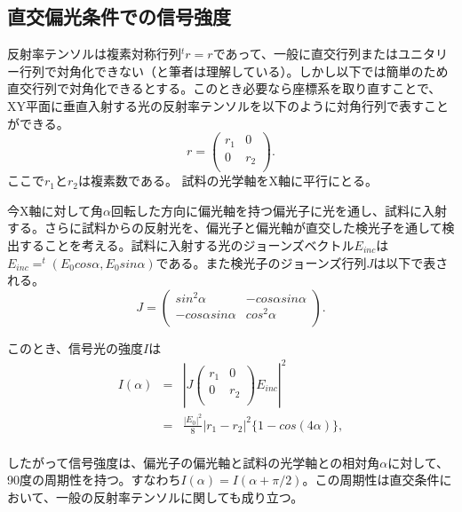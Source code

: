 \subsection{直交偏光条件での信号強度}
\label{sec:diagonazed_reflectance}
反射率テンソルは複素対称行列${}^t r=r$であって、一般に直交行列またはユニタリー行列で対角化できない（と筆者は理解している）。しかし以下では簡単のため直交行列で対角化できるとする。このとき必要なら座標系を取り直すことで、XY平面に垂直入射する光の反射率テンソルを以下のように対角行列で表すことができる。
\[
  r = \left(
    \begin{array}{cc}
      r_1 &0  \\
      0 & r_2  \\
    \end{array} 
  \right) .
\]
ここで$r_1$と$r_2$は複素数である。 試料の光学軸をX軸に平行にとる。

今X軸に対して角$\alpha$回転した方向に偏光軸を持つ偏光子に光を通し、試料に入射する。さらに試料からの反射光を、偏光子と偏光軸が直交した検光子を通して検出することを考える。試料に入射する光のジョーンズベクトル$E_{inc}$は$E_{inc}=^t (E_0 cos\alpha, E_0 sin\alpha)$である。また検光子のジョーンズ行列$J$は以下で表される。
\[ J =\left(
    \begin{array}{cc}
      sin^2 \alpha & -cos\alpha sin\alpha  \\
      -cos\alpha sin\alpha & cos^2 \alpha  \\
    \end{array} 
  \right).
\] 

このとき、信号光の強度$I$は
\begin{eqnarray}
I(\alpha) &=& |J
 \left(
    \begin{array}{cc}
      r_1 &0  \\
      0 & r_2  \\
    \end{array} 
  \right)
  E_{inc}|^2\\
 &=& \frac{|E_0|^2}{8}|r_1-r_2|^2 \{1-cos(4\alpha)\},\\
\end{eqnarray}

したがって信号強度は、偏光子の偏光軸と試料の光学軸との相対角$\alpha$に対して、90度の周期性を持つ。すなわち$I(\alpha)=I(\alpha+\pi/2)$。この周期性は直交条件において、一般の反射率テンソルに関しても成り立つ。

\newpage